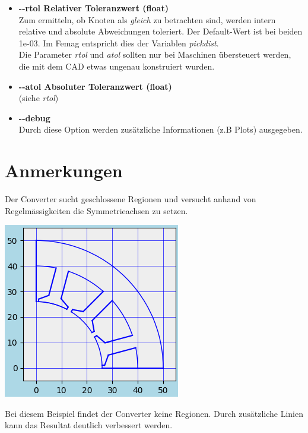 \documentclass[10pt, a4paper,german]{scrartcl}
\newcommand{\Slanted}[1]{{\normalfont\slshape #1}}
\newcommand{\LongArg}[1]{\mbox{{-}{-}#1}}
\begin{document}
\begin{itemize}
\item {\bfseries{\LongArg{rtol} Relativer Toleranzwert (float)}}\\
		Zum ermitteln, ob Knoten als \Slanted{gleich} zu betrachten sind, werden intern relative
		und absolute Abweichungen toleriert. Der Default-Wert ist bei beiden 1e-03. Im Femag
		entspricht dies der Variablen \Slanted{pickdist}.\\
		Die Parameter \Slanted{rtol} und \Slanted{atol} sollten nur bei Maschinen übersteuert 
		werden, die mit dem CAD etwas ungenau konstruiert wurden.
		
\item {\bfseries{\LongArg{atol} Absoluter Toleranzwert (float)}}\\
		(siehe \Slanted{rtol})
		
\item {\bfseries{\LongArg{debug}}}\\
		Durch diese Option werden zusätzliche Informationen (z.B Plots) ausgegeben.
\end{itemize}

\section{Anmerkungen}
Der Converter sucht geschlossene Regionen und versucht anhand von Regelmässigkeiten die
Symmetrieachsen zu setzen.
\begin{center}
\includegraphics[width=0.45\linewidth]{BspStator}
\end{center}
Bei diesem Beispiel findet der Converter keine Regionen.
Durch zusätzliche Linien kann das Resultat deutlich verbessert werden.
\end{document}
